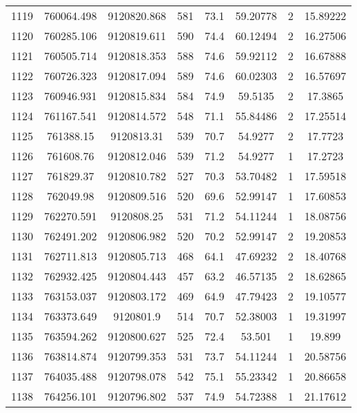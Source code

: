 \begin{longtable}{cccccccc}
1119 & 760064.498      & 9120820.868      & 581     & 73.1  & 59.20778 & 2  & 15.89222 \\
1120 & 760285.106      & 9120819.611      & 590     & 74.4  & 60.12494 & 2  & 16.27506 \\
1121 & 760505.714      & 9120818.353      & 588     & 74.6  & 59.92112 & 2  & 16.67888 \\
1122 & 760726.323      & 9120817.094      & 589     & 74.6  & 60.02303 & 2  & 16.57697 \\
1123 & 760946.931      & 9120815.834      & 584     & 74.9  & 59.5135  & 2  & 17.3865  \\
1124 & 761167.541      & 9120814.572      & 548     & 71.1  & 55.84486 & 2  & 17.25514 \\
1125 & 761388.15       & 9120813.31       & 539     & 70.7  & 54.9277  & 2  & 17.7723  \\
1126 & 761608.76       & 9120812.046      & 539     & 71.2  & 54.9277  & 1  & 17.2723  \\
1127 & 761829.37       & 9120810.782      & 527     & 70.3  & 53.70482 & 1  & 17.59518 \\
1128 & 762049.98       & 9120809.516      & 520     & 69.6  & 52.99147 & 1  & 17.60853 \\
1129 & 762270.591      & 9120808.25       & 531     & 71.2  & 54.11244 & 1  & 18.08756 \\
1130 & 762491.202      & 9120806.982      & 520     & 70.2  & 52.99147 & 2  & 19.20853 \\
1131 & 762711.813      & 9120805.713      & 468     & 64.1  & 47.69232 & 2  & 18.40768 \\
1132 & 762932.425      & 9120804.443      & 457     & 63.2  & 46.57135 & 2  & 18.62865 \\
1133 & 763153.037      & 9120803.172      & 469     & 64.9  & 47.79423 & 2  & 19.10577 \\
1134 & 763373.649      & 9120801.9        & 514     & 70.7  & 52.38003 & 1  & 19.31997 \\
1135 & 763594.262      & 9120800.627      & 525     & 72.4  & 53.501   & 1  & 19.899   \\
1136 & 763814.874      & 9120799.353      & 531     & 73.7  & 54.11244 & 1  & 20.58756 \\
1137 & 764035.488      & 9120798.078      & 542     & 75.1  & 55.23342 & 1  & 20.86658 \\
1138 & 764256.101      & 9120796.802      & 537     & 74.9  & 54.72388 & 1  & 21.17612 \\

\end{longtable}
